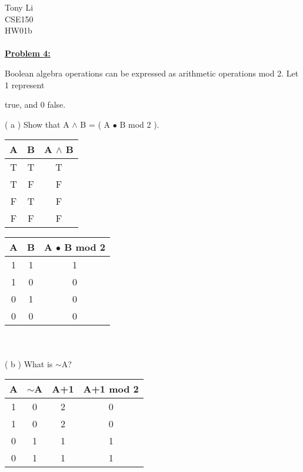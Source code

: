 \documentclass[11pt]{article}
\begin{document}
\noindent 
Tony Li \\
CSE150 \\
HW01b \\\\
	\textbf{\underline{Problem 4:}}


	Boolean algebra operations can be expressed as arithmetic operations mod 2. Let 1 represent 

	true, and 0 false.

	( a ) Show that A $\wedge$ B = ( A $\bullet$ B mod 2 ).\\

	\begin{minipage}{0.5\textwidth}
		\begin{tabular}{||c c c||} 
 		\hline
 		A & B & A $\wedge$ B\\ [0.5ex] 
 		\hline\hline
 		T & T & T\\ 
 		\hline
 		T & F & F\\
 		\hline
 		F & T & F\\
 		\hline
 		F & F & F\\
 		\hline
		\end{tabular}
	\end{minipage}
	\begin{minipage}{0.5\textwidth}
		\begin{tabular}{||c c c||} 
 		\hline
 		A & B & A $\bullet$ B mod 2\\ [0.5ex] 
 		\hline\hline
 		1 & 1 & 1\\ 
 		\hline
 		1 & 0 & 0\\
 		\hline
 		0 & 1 & 0\\
 		\hline
 		0 & 0 & 0\\
 		\hline
		\end{tabular}
	\end{minipage}\\\\

	( b ) What is $\sim$A?\\

	\begin{tabular}{||c c c c||} 
 		\hline
 		A & $\sim$A & A+1 & A+1 mod 2\\ [0.5ex] 
 		\hline\hline
 		1 & 0 & 2 & 0\\ 
 		\hline
 		1 & 0 & 2 & 0\\
 		\hline
 		0 & 1 & 1 & 1\\
 		\hline
 		0 & 1 & 1 & 1\\
 		\hline
		\end{tabular}\\\\
\end{document}
